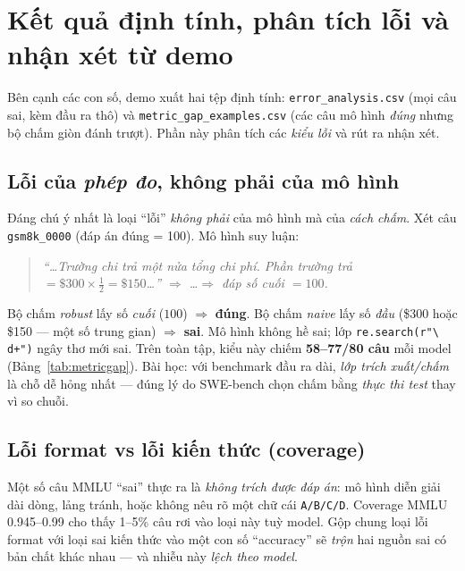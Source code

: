 \section{Kết quả định tính, phân tích lỗi và nhận xét từ demo}
\label{sec:error}

Bên cạnh các con số, demo xuất hai tệp định tính: \texttt{error\_analysis.csv}
(mọi câu sai, kèm đầu ra thô) và \texttt{metric\_gap\_examples.csv} (các câu mô
hình \emph{đúng} nhưng bộ chấm giòn đánh trượt). Phần này phân tích các \emph{kiểu
lỗi} và rút ra nhận xét.

\subsection{Lỗi của \emph{phép đo}, không phải của mô hình}

Đáng chú ý nhất là loại ``lỗi'' \emph{không phải} của mô hình mà của \emph{cách
chấm}. Xét câu \texttt{gsm8k\_0000} (đáp án đúng = 100). Mô hình suy luận:

\begin{quote}\small\itshape
``\ldots Trường chi trả một nửa tổng chi phí. Phần trường trả $= \$300 \times
\tfrac{1}{2} = \$150$\ldots'' $\Rightarrow$ \ldots $\Rightarrow$ đáp số cuối $= 100$.
\end{quote}

Bộ chấm \emph{robust} lấy số \emph{cuối} ($100$) $\Rightarrow$ \textbf{đúng}. Bộ
chấm \emph{naive} lấy số \emph{đầu} (\$300 hoặc \$150 --- một số trung gian)
$\Rightarrow$ \textbf{sai}. Mô hình không hề sai; lớp \texttt{re.search(r"\textbackslash
d+")} ngây thơ mới sai. Trên toàn tập, kiểu này chiếm \textbf{58--77/80 câu} mỗi
model (Bảng~\ref{tab:metricgap}). Bài học: với benchmark đầu ra dài, \emph{lớp trích
xuất/chấm} là chỗ dễ hỏng nhất --- đúng lý do SWE-bench chọn chấm bằng \emph{thực
thi test} thay vì so chuỗi.

\subsection{Lỗi format vs lỗi kiến thức (coverage)}

Một số câu MMLU ``sai'' thực ra là \emph{không trích được đáp án}: mô hình diễn giải
dài dòng, lảng tránh, hoặc không nêu rõ một chữ cái \texttt{A/B/C/D}. Coverage MMLU
0.945--0.99 cho thấy 1--5\% câu rơi vào loại này tuỳ model. Gộp chung loại lỗi
format với loại sai kiến thức vào một con số ``accuracy'' sẽ \emph{trộn} hai nguồn
sai có bản chất khác nhau --- và nhiễu này \emph{lệch theo model}.

